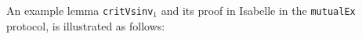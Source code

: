 \documentclass[final]{IEEEtran}
\begin{document}
{%


 An  example lemma
{\tt critVsinv$_1$} and its proof in Isabelle in the {\tt mutualEx} protocol, is illustrated as follows:

}
\end{document}
